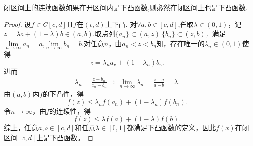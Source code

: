 \documentclass[../../main.tex]{subfiles}%
\begin{document}
\begin{proposition}\label{proposition:开区间下凸闭区间连续的函数在闭区间上仍然下凸}
闭区间上的连续函数如果在开区间内是下凸函数,则必然在闭区间上也是下凸函数.
\end{proposition}
\begin{proof}
设$f\in C[c,d]$且$f$在$(c,d)$上下凸.
对$\forall a,b\in [c,d]$,任取$\lambda \in (0,1)$，记$z = \lambda a + (1-\lambda) b \in (a,b)$.取点列$\{a_n\} \subset (a,z)$,$\{b_n\} \subset (z,b)$，满足$\lim\limits_{n \to \infty} a_n = a$,$\lim\limits_{n \to \infty} b_n = b$.对任意$n$，由$a_n < z < b_n$知，存在唯一的$\lambda_n \in (0,1)$使得
$$
z = \lambda_n a_n + (1-\lambda_n) b_n.
$$
进而
\begin{align*}
\lambda _n=\frac{z-b_n}{a_n-b_n}\Longrightarrow \underset{n\rightarrow \infty}{\lim}\lambda _n=\frac{z-a}{a-b}=\lambda .
\end{align*}
由$(a,b)$内$f$的下凸性，得
$$
f(z) \leqslant \lambda_n f(a_n) + (1-\lambda_n) f(b_n).
$$
令$n \to \infty$，由$f$的连续性，得
$$f(z) \leqslant \lambda f(a) + (1-\lambda) f(b) .$$
综上，任意$a,b \in [c,d]$和任意$\lambda \in [0,1]$都满足下凸函数的定义，因此$f(x)$在闭区间$[c,d]$上是下凸函数。
\end{proof}
\end{document}
